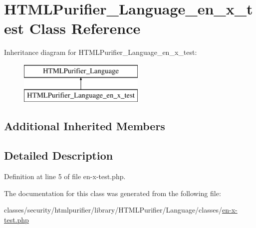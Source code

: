 \hypertarget{classHTMLPurifier__Language__en__x__test}{\section{H\+T\+M\+L\+Purifier\+\_\+\+Language\+\_\+en\+\_\+x\+\_\+test Class Reference}
\label{classHTMLPurifier__Language__en__x__test}
}
Inheritance diagram for H\+T\+M\+L\+Purifier\+\_\+\+Language\+\_\+en\+\_\+x\+\_\+test\+:\begin{figure}[H]
\begin{center}
\leavevmode
\includegraphics[height=2.000000cm]{classHTMLPurifier__Language__en__x__test}
\end{center}
\end{figure}
\subsection*{Additional Inherited Members}


\subsection{Detailed Description}


Definition at line 5 of file en-\/x-\/test.\+php.



The documentation for this class was generated from the following file\+:\begin{DoxyCompactItemize}
\item 
classes/security/htmlpurifier/library/\+H\+T\+M\+L\+Purifier/\+Language/classes/\hyperlink{classes_2en-x-test_8php}{en-\/x-\/test.\+php}\end{DoxyCompactItemize}
